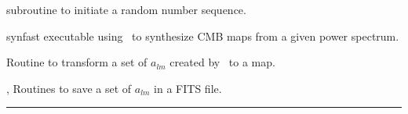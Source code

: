 \begin{related}
  \begin{sulist}{} %
  \item[\htmlref{rand\_init}{sub:rand_init}] subroutine to initiate a random number sequence. 
  \item[synfast] executable using \thedocid\ to synthesize CMB maps from a given
  power spectrum.
  \item[\htmlref{alm2map}{sub:alm2map}] Routine to transform a set of $a_{lm}$ created by \thedocid\ to a \healpix map.
  \item[\htmlref{alms2fits}{sub:alms2fits}, \htmlref{dump\_alms}{sub:dump_alms}]
  Routines to save a set of $a_{lm}$ in a FITS file.  
  \end{sulist}
\end{related}

\rule{\hsize}{2mm}

\newpage

